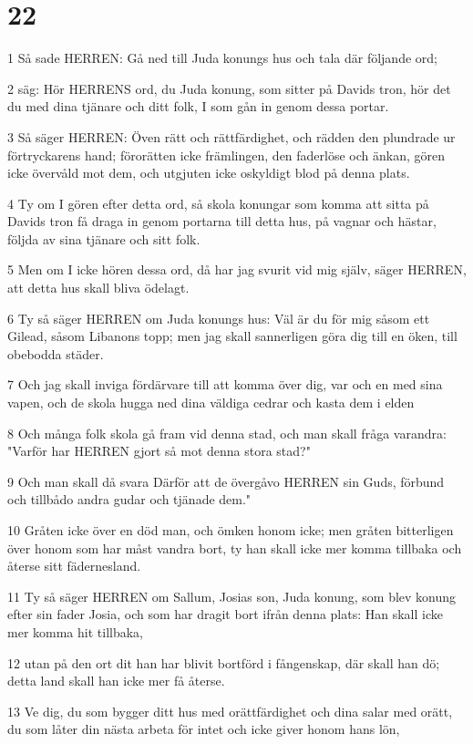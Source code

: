 \chapter{22}

\par 1 Så sade HERREN: Gå ned till Juda konungs hus och tala där följande ord;
\par 2 säg: Hör HERRENS ord, du Juda konung, som sitter på Davids tron, hör det du med dina tjänare och ditt folk, I som gån in genom dessa portar.
\par 3 Så säger HERREN: Öven rätt och rättfärdighet, och rädden den plundrade ur förtryckarens hand; förorätten icke främlingen, den faderlöse och änkan, gören icke övervåld mot dem, och utgjuten icke oskyldigt blod på denna plats.
\par 4 Ty om I gören efter detta ord, så skola konungar som komma att sitta på Davids tron få draga in genom portarna till detta hus, på vagnar och hästar, följda av sina tjänare och sitt folk.
\par 5 Men om I icke hören dessa ord, då har jag svurit vid mig själv, säger HERREN, att detta hus skall bliva ödelagt.
\par 6 Ty så säger HERREN om Juda konungs hus: Väl är du för mig såsom ett Gilead, såsom Libanons topp; men jag skall sannerligen göra dig till en öken, till obebodda städer.
\par 7 Och jag skall inviga fördärvare till att komma över dig, var och en med sina vapen, och de skola hugga ned dina väldiga cedrar och kasta dem i elden
\par 8 Och många folk skola gå fram vid denna stad, och man skall fråga varandra: "Varför har HERREN gjort så mot denna stora stad?"
\par 9 Och man skall då svara Därför att de övergåvo HERREN sin Guds, förbund och tillbådo andra gudar och tjänade dem."
\par 10 Gråten icke över en död man, och ömken honom icke; men gråten bitterligen över honom som har måst vandra bort, ty han skall icke mer komma tillbaka och återse sitt fädernesland.
\par 11 Ty så säger HERREN om Sallum, Josias son, Juda konung, som blev konung efter sin fader Josia, och som har dragit bort ifrån denna plats: Han skall icke mer komma hit tillbaka,
\par 12 utan på den ort dit han har blivit bortförd i fångenskap, där skall han dö; detta land skall han icke mer få återse.
\par 13 Ve dig, du som bygger ditt hus med orättfärdighet och dina salar med orätt, du som låter din nästa arbeta för intet och icke giver honom hans lön,
